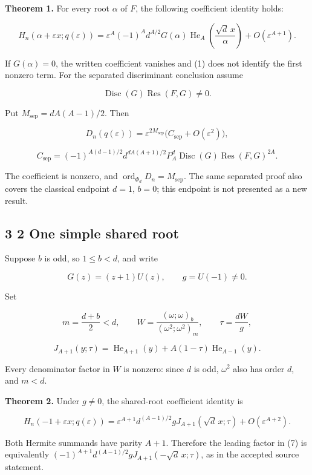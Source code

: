 \documentclass[
  11pt,
]{article}
\begin{document}
\textbf{Theorem 1.} For every root \(\alpha\) of \(F\), the following
coefficient identity holds:

\[
H_n(\alpha+\varepsilon x;q(\varepsilon))
=\varepsilon^A(-1)^A d^{A/2}G(\alpha)
\operatorname{He}_A\!\left(\frac{\sqrt d\,x}{\alpha}\right)
+O(\varepsilon^{A+1}). \tag{1}
\]

If \(G(\alpha)=0\), the written coefficient vanishes and (1) does not
identify the first nonzero term. For the separated discriminant
conclusion assume

\[
\operatorname{Disc}(G)\operatorname{Res}(F,G)\ne 0. \tag{2}
\]

Put \(M_{\mathrm{sep}}=dA(A-1)/2\). Then

\[
D_n(q(\varepsilon))=
\varepsilon^{2M_{\mathrm{sep}}}
\bigl(C_{\mathrm{sep}}+O(\varepsilon^2)\bigr), \tag{3}
\]

\[
C_{\mathrm{sep}}=
(-1)^{A(d-1)/2}d^{dA(A+1)/2}P_A^d
\operatorname{Disc}(G)\operatorname{Res}(F,G)^{2A}. \tag{4}
\]

The coefficient is nonzero, and
\(\operatorname{ord}_{\Phi_d}D_n=M_{\mathrm{sep}}\). The same separated
proof also covers the classical endpoint \(d=1\), \(b=0\); this endpoint
is not presented as a new result.

\subsection{3 2 One simple shared root}\label{one-simple-shared-root}

Suppose \(b\) is odd, so \(1\leq b<d\), and write

\[
G(z)=(z+1)U(z),\qquad g=U(-1)\ne 0.
\]

Set

\[
m=\frac{d+b}{2}<d,\qquad
W=\frac{(\omega;\omega)_b}{(\omega^2;\omega^2)_m},
\qquad \tau=\frac{dW}{g}, \tag{5}
\]

\[
J_{A+1}(y;\tau)=\operatorname{He}_{A+1}(y)
+A(1-\tau)\operatorname{He}_{A-1}(y). \tag{6}
\]

Every denominator factor in \(W\) is nonzero: since \(d\) is odd,
\(\omega^2\) also has order \(d\), and \(m<d\).

\textbf{Theorem 2.} Under \(g\ne 0\), the shared-root coefficient
identity is

\[
H_n(-1+\varepsilon x;q(\varepsilon))
=\varepsilon^{A+1}d^{(A-1)/2}g
J_{A+1}(\sqrt d\,x;\tau)+O(\varepsilon^{A+2}). \tag{7}
\]

Both Hermite summands have parity \(A+1\). Therefore the leading factor
in (7) is equivalently
\((-1)^{A+1}d^{(A-1)/2}gJ_{A+1}(-\sqrt d\,x;\tau)\), as in the accepted
source statement.
\end{document}
